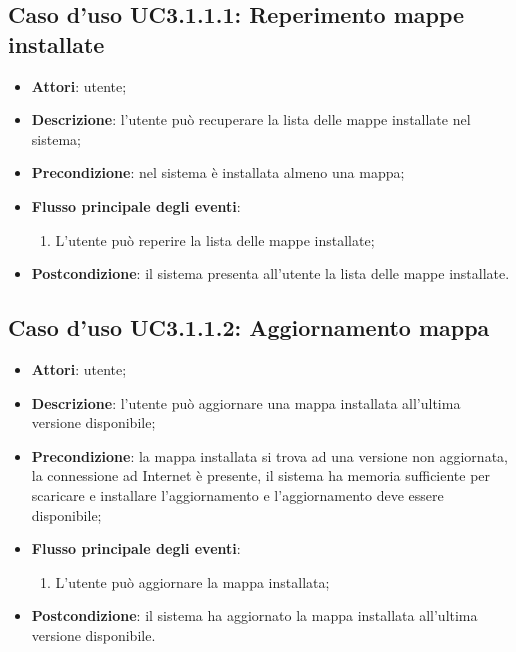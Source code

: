 \documentclass[../AnalisiDeiRequisiti.tex]{subfiles}
\begin{document}
\subsection{Caso d'uso UC3.1.1.1: Reperimento mappe installate}
\begin{itemize}
\item \textbf{Attori}: utente;
\item \textbf{Descrizione}: l'utente può recuperare la lista delle mappe installate nel sistema; 
      \item \textbf{Precondizione}: nel sistema è installata almeno una mappa;

        \item \textbf{Flusso principale degli eventi}:
          \begin{enumerate}
          \item L'utente può reperire la lista delle mappe installate;

      \end{enumerate}
    \item \textbf{Postcondizione}: il sistema presenta all'utente la lista delle mappe installate.
  \end{itemize}
\hypertarget{UC3.1.1.2}{}
\subsection{Caso d'uso UC3.1.1.2: Aggiornamento mappa}
\begin{itemize}
\item \textbf{Attori}: utente;
\item \textbf{Descrizione}: l'utente può aggiornare una mappa installata all'ultima versione disponibile; 
      \item \textbf{Precondizione}: la mappa installata si trova ad una versione non aggiornata, la connessione ad Internet è presente, il sistema ha memoria sufficiente per scaricare e installare l'aggiornamento e l'aggiornamento deve essere disponibile;

        \item \textbf{Flusso principale degli eventi}:
          \begin{enumerate}
          \item L'utente può aggiornare la mappa installata;

      \end{enumerate}
    \item \textbf{Postcondizione}: il sistema ha aggiornato la mappa installata all'ultima versione disponibile.
  \end{itemize}
\hypertarget{UC3.1.1.3}{}
\end{document}

